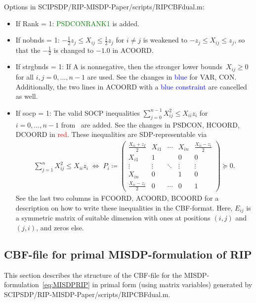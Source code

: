 \documentclass[11pt,a4paper]{article}
\newcommand{\define}{\coloneqq}
\theoremstyle{definition}
\begin{document}
Options in \textsf{SCIPSDP/RIP-MISDP-Paper/scripts/RIPCBFdual.m}:
\begin{itemize}
\item If Rank = 1: \textcolor{green}{PSDCONRANK1} is added.
\item If nobnds = 1: {\color{orange}
    $-\tfrac{1}{2}z_j \leq X_{ij} \leq \tfrac{1}{2}z_j$ for $i \neq j$} is
  weakened to {\color{orange}$-z_j \leq X_{ij} \leq z_j$}, so that the
  {\color{orange} $-\tfrac{1}{2}$} is changed to $-1.0$ in ACOORD.
\item If strgbnds = 1: If A is nonnegative, then the stronger lower
  bounds~$X_{ij} \geq 0$ for all $i,j =0,\dots,n-1$ are used. See the
  changes in \textcolor{blue}{blue} for VAR, CON. Additionally, the two
  lines in ACOORD with a \textcolor{blue}{blue constraint} are cancelled
  as well.
\item If socp = 1: The valid SOCP inequalities
  $\sum_{j=0}^{n-1}X_{ij}^2 \leq X_{ii}z_i$ for $i = 0,\dots,n-1$
  from~\cite{LiX20} are added. See the changes in PSDCON, HCOORD, DCOORD in
  \textcolor{red}{red}. These inequalities are SDP-representable via
  \begin{align*}
    \sum_{j=1}^n X_{ij}^2 \leq X_{ii}z_i \; \Leftrightarrow \;
    P_i \define \begin{pmatrix}
      \tfrac{X_{ii}+z_I}{2} & X_{i1} & \cdots & X_{in} & \tfrac{X_{ii}-z_i}{2}
      \\
      X_{i1} & 1 & & 0 & 0 \\
      \vdots &\vdots & \ddots & \vdots & \vdots \\
      X_{in} & 0 & & 1 & 0 \\
      \tfrac{X_{ii}-z_i}{2} & 0 & \cdots & 0 & 1
    \end{pmatrix} \succeq 0.
  \end{align*}
  See the last two columns in FCOORD, ACOORD, BCOORD for a description on
  how to write these inequalities in the CBF-format. Here, $E_{ij}$ is a
  symmetric matrix of suitable dimension with ones at positions $(i,j)$ and
  $(j,i)$, and zeros else.
\end{itemize}

\subsection{CBF-file for primal MISDP-formulation of RIP}
\label{sec:CBFprimal}
This section describes the structure of the CBF-file for the
MISDP-formulation~\eqref{eq:MISDPRIP} in primal form (using matrix variables)
generated by
\textsf{SCIPSDP/RIP-MISDP-Paper/scripts/RIPCBFdual.m}.\\
\end{document}
